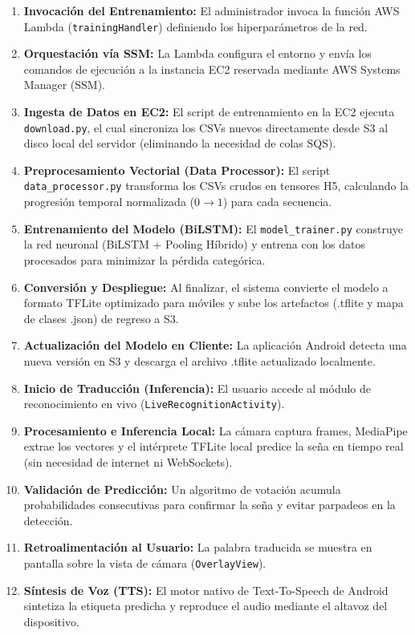 \begin{enumerate}
    \item \textbf{Invocación del Entrenamiento:} El administrador invoca la función AWS Lambda (\texttt{trainingHandler}) definiendo los hiperparámetros de la red.

    \item \textbf{Orquestación vía SSM:} La Lambda configura el entorno y envía los comandos de ejecución a la instancia EC2 reservada mediante AWS Systems Manager (SSM).

    \item \textbf{Ingesta de Datos en EC2:} El script de entrenamiento en la EC2 ejecuta \texttt{download.py}, el cual sincroniza los CSVs nuevos directamente desde S3 al disco local del servidor (eliminando la necesidad de colas SQS).

    \item \textbf{Preprocesamiento Vectorial (Data Processor):} El script \texttt{data\_processor.py} transforma los CSVs crudos en tensores H5, calculando la progresión temporal normalizada ($0 \to 1$) para cada secuencia.

    \item \textbf{Entrenamiento del Modelo (BiLSTM):} El \texttt{model\_trainer.py} construye la red neuronal (BiLSTM + Pooling Híbrido) y entrena con los datos procesados para minimizar la pérdida categórica.

    \item \textbf{Conversión y Despliegue:} Al finalizar, el sistema convierte el modelo a formato TFLite optimizado para móviles y sube los artefactos (.tflite y mapa de clases .json) de regreso a S3.

    \item \textbf{Actualización del Modelo en Cliente:} La aplicación Android detecta una nueva versión en S3 y descarga el archivo .tflite actualizado localmente.

    \item \textbf{Inicio de Traducción (Inferencia):} El usuario accede al módulo de reconocimiento en vivo (\texttt{LiveRecognitionActivity}).

    \item \textbf{Procesamiento e Inferencia Local:} La cámara captura frames, MediaPipe extrae los vectores y el intérprete TFLite local predice la seña en tiempo real (sin necesidad de internet ni WebSockets).

    \item \textbf{Validación de Predicción:} Un algoritmo de votación acumula probabilidades consecutivas para confirmar la seña y evitar parpadeos en la detección.

    \item \textbf{Retroalimentación al Usuario:} La palabra traducida se muestra en pantalla sobre la vista de cámara (\texttt{OverlayView}).

    \item \textbf{Síntesis de Voz (TTS):} El motor nativo de Text-To-Speech de Android sintetiza la etiqueta predicha y reproduce el audio mediante el altavoz del dispositivo.
\end{enumerate}
